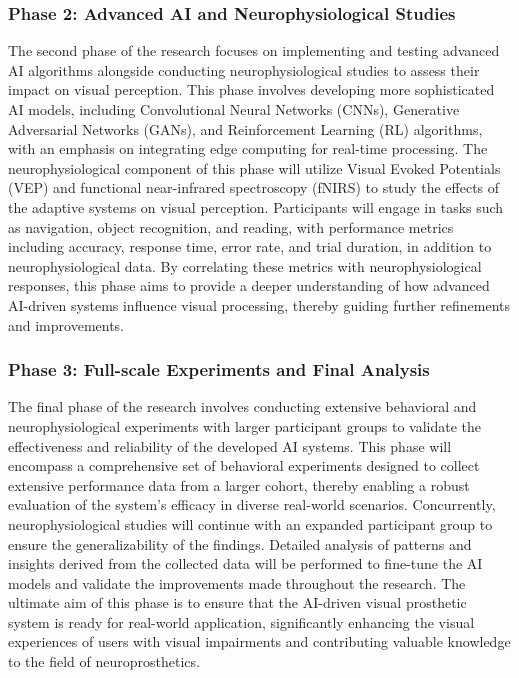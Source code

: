 \documentclass[10pt]{article}
\begin{document}
\subsubsection*{Phase 2: Advanced AI and Neurophysiological Studies}
The second phase of the research focuses on implementing and testing advanced AI
algorithms alongside conducting neurophysiological studies to assess their
impact on visual perception. This phase involves developing more sophisticated
AI models, including Convolutional Neural Networks (CNNs), Generative
Adversarial Networks (GANs), and Reinforcement Learning (RL) algorithms, with an
emphasis on integrating edge computing for real-time processing. The
neurophysiological component of this phase will utilize Visual Evoked Potentials
(VEP) and functional near-infrared spectroscopy (fNIRS) to study the effects of
the adaptive systems on visual perception. Participants will engage in tasks
such as navigation, object recognition, and reading, with performance metrics
including accuracy, response time, error rate, and trial duration, in addition
to neurophysiological data. By correlating these metrics with neurophysiological
responses, this phase aims to provide a deeper understanding of how advanced
AI-driven systems influence visual processing, thereby guiding further
refinements and improvements.

\subsubsection*{Phase 3: Full-scale Experiments and Final Analysis}
The final phase of the research involves conducting extensive behavioral and
neurophysiological experiments with larger participant groups to validate the
effectiveness and reliability of the developed AI systems. This phase will
encompass a comprehensive set of behavioral experiments designed to collect
extensive performance data from a larger cohort, thereby enabling a robust
evaluation of the system's efficacy in diverse real-world scenarios.
Concurrently, neurophysiological studies will continue with an expanded
participant group to ensure the generalizability of the findings. Detailed
analysis of patterns and insights derived from the collected data will be
performed to fine-tune the AI models and validate the improvements made
throughout the research. The ultimate aim of this phase is to ensure that the
AI-driven visual prosthetic system is ready for real-world application,
significantly enhancing the visual experiences of users with visual impairments
and contributing valuable knowledge to the field of neuroprosthetics.
\end{document}
